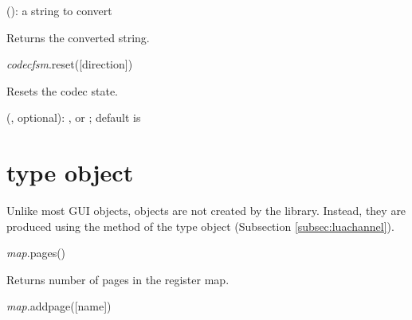 \documentclass[a4paper,12pt,twoside,extrafontsizes]{memoir}
\begin{document}
\begin{funcparams}
	 (): a string to convert
\end{funcparams}

\begin{funcret}
	Returns the converted string.
\end{funcret}


\begin{luafuncprototype}
\emph{codecfsm}.reset([direction])
\end{luafuncprototype}

\begin{funcdescr}
	Resets the codec state.
\end{funcdescr}

\begin{funcparams}
	 (, optional): ,  or ; default is 
\end{funcparams}

\section[RegisterMap type object]{ type object}
\label{sec:luaregistermap}

Unlike most  GUI objects,  objects are not created by the  library. Instead, they are produced using the  method of the  type object (Subsection \ref{subsec:luachannel}).


\begin{luafuncprototype}
\emph{map}.pages()
\end{luafuncprototype}

\begin{funcret}
	Returns number of pages in the register map.
\end{funcret}


\begin{luafuncprototype}
\emph{map}.addpage([name])
\end{luafuncprototype}
\end{document}
